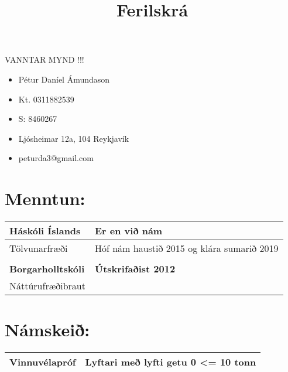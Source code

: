 \documentclass[]{article}
\begin{document}
\title{Ferilskrá}
\maketitle

VANNTAR MYND !!!
\begin{itemize}
	\item Pétur Daníel Ámundason
	\item Kt. 0311882539 
	\item S: 8460267 
	\item Ljósheimar 12a, 104 Reykjavík
	\item peturda3@gmail.com
\end{itemize}

\section*{Menntun:}
\begin{table}[h]
	\centering
	\label{my-label}
	\begin{tabular}{|p{7cm}|p{10cm}|}
		\hline
		\textbf{Háskóli Íslands}  & {\textbf{Er en við nám}}                     
		\\ \hline 
		Tölvunarfræði             & {Hóf nám haustið 2015 og klára sumarið 2019} 
		\\ \hline 
		 &
		\\ \hline
		\textbf{Borgarholltskóli} & {\textbf{Útskrifaðist 2012}}                 
		\\ \hline 
		Náttúrufræðibraut        &          
		\\ \hline                             
	\end{tabular}
\end{table}
\section*{Námskeið:}
\begin{table}[h]
	\centering
	\label{my-label}
	\begin{tabular}{|p{7cm}|p{10cm}|}
		\hline
		\textbf{Vinnuvélapróf} & 
		\textbf{Lyftari með lyfti getu 0 \textless= 10 tonn}
		\\ \hline
	\end{tabular}
\end{table}
\end{document}
